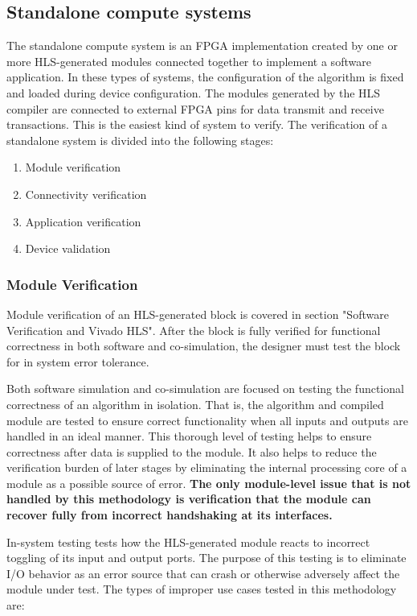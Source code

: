 \subsection{Standalone compute systems}
The standalone compute system is an FPGA implementation created by one or more
HLS-generated modules connected together to implement a software application. In these
types of systems, the configuration of the algorithm is fixed and loaded during device
configuration. The modules generated by the HLS compiler are connected to external FPGA
pins for data transmit and receive transactions. This is the easiest kind of system to verify.
The verification of a standalone system is divided into the following stages:
\begin{enumerate}
  \item Module verification
  \item Connectivity verification
  \item Application verification
  \item Device validation
\end{enumerate}

\subsubsection{Module Verification}
Module verification of an HLS-generated block is covered in section "Software
Verification and Vivado HLS". After the block is fully verified for functional correctness in
both software and co-simulation, the designer must test the block for in system error
tolerance.

\par Both software simulation and co-simulation are focused on testing the functional
correctness of an algorithm in isolation. That is, the algorithm and compiled module are
tested to ensure correct functionality when all inputs and outputs are handled in an ideal
manner. This thorough level of testing helps to ensure correctness after data is supplied to
the module. It also helps to reduce the verification burden of later stages by eliminating the
internal processing core of a module as a possible source of error. \textbf{The only module-level
issue that is not handled by this methodology is verification that the module can recover
fully from incorrect handshaking at its interfaces.}

\par In-system testing tests how the HLS-generated module reacts to incorrect toggling of its
input and output ports. The purpose of this testing is to eliminate I/O behavior as an error
source that can crash or otherwise adversely affect the module under test. The types of
improper use cases tested in this methodology are:

